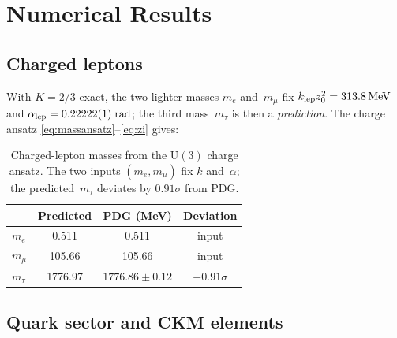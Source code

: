 \documentclass[12pt,a4paper]{article}
\newcommand{\UU}{\mathrm{U}}
\newcommand{\MeV}{\,\mathrm{MeV}}
\begin{document}
\section{Numerical Results}
\label{sec:numerics}

\subsection{Charged leptons}

With $K = 2/3$ exact, the two lighter masses $m_e$ and~$m_\mu$
fix $k_{\rm lep} z_0^2 = 313.8\MeV$ and $\alpha_{\rm lep} =
0.22222(1)\;\text{rad}$; the third mass~$m_\tau$ is then a
\emph{prediction}.  The charge ansatz
\eqref{eq:massansatz}--\eqref{eq:zi} gives:

\begin{table}[ht]
\centering
\begin{tabular}{lccc}
\toprule
  & Predicted & PDG (MeV) & Deviation \\
\midrule
$m_e$ & 0.511 & 0.511 & input \\
$m_\mu$ & 105.66 & 105.66 & input \\
$m_\tau$ & 1776.97 & $1776.86 \pm 0.12$ & $+0.91\sigma$ \\
\bottomrule
\end{tabular}
\caption{Charged-lepton masses from the $\UU(3)$ charge ansatz.
The two inputs $(m_e, m_\mu)$ fix $k$ and~$\alpha$; the
predicted~$m_\tau$ deviates by $0.91\sigma$ from PDG.}
\label{tab:leptons}
\end{table}

\subsection{Quark sector and CKM elements}
\end{document}
